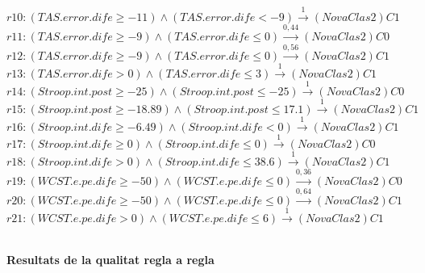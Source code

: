 $r10: (TAS.error.dife \geq -11) \wedge (TAS.error.dife < -9)\stackrel{1}{\longrightarrow} (NovaClas2)C1$\\

$r11: (TAS.error.dife \geq -9) \wedge (TAS.error.dife \leq 0)\stackrel{0,44}{\longrightarrow} (NovaClas2)C0$\\

$r12: (TAS.error.dife \geq -9) \wedge (TAS.error.dife \leq 0)\stackrel{0,56}{\longrightarrow} (NovaClas2)C1$\\

$r13: (TAS.error.dife>0) \wedge (TAS.error.dife \leq 3)\stackrel{1}{\longrightarrow} (NovaClas2)C1$\\

$r14: (Stroop.int.post \geq -25) \wedge (Stroop.int.post \leq -25)\stackrel{1}{\longrightarrow} (NovaClas2)C0$\\

$r15: (Stroop.int.post \geq -18.89) \wedge (Stroop.int.post \leq 17.1)\stackrel{1}{\longrightarrow} (NovaClas2)C1$\\

$r16: (Stroop.int.dife \geq -6.49) \wedge (Stroop.int.dife < 0)\stackrel{1}{\longrightarrow} (NovaClas2)C1$\\

$r17: (Stroop.int.dife \geq 0) \wedge (Stroop.int.dife \leq 0)\stackrel{1}{\longrightarrow} (NovaClas2)C0$\\

$r18: (Stroop.int.dife>0) \wedge (Stroop.int.dife \leq 38.6)\stackrel{1}{\longrightarrow} (NovaClas2)C1$\\

$r19: (WCST.e.pe.dife \geq -50) \wedge (WCST.e.pe.dife \leq 0)\stackrel{0,36}{\longrightarrow} (NovaClas2)C0$\\

$r20: (WCST.e.pe.dife \geq -50) \wedge (WCST.e.pe.dife \leq 0)\stackrel{0,64}{\longrightarrow} (NovaClas2)C1$\\

$r21: (WCST.e.pe.dife>0) \wedge (WCST.e.pe.dife \leq 6)\stackrel{1}{\longrightarrow} (NovaClas2)C1$\\

\newpage
\vspace{3ex}
\mbox{ }
\begin{center} \Large \bf Resultats de la qualitat regla a regla \end{center}

